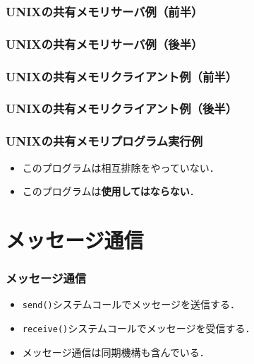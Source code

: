 \documentclass{beamer}                   %
\begin{document}
\begin{frame}
  \frametitle{UNIXの共有メモリサーバ例（前半）}
\end{frame}

\begin{frame}
  \frametitle{UNIXの共有メモリサーバ例（後半）}
\end{frame}

\begin{frame}
  \frametitle{UNIXの共有メモリクライアント例（前半）}
\end{frame}

\begin{frame}
  \frametitle{UNIXの共有メモリクライアント例（後半）}
\end{frame}

\begin{frame}
  \frametitle{UNIXの共有メモリプログラム実行例}
  \begin{itemize}
  \item このプログラムは相互排除をやっていない．
  \item このプログラムは{\bf 使用してはならない}．
  \end{itemize}
\end{frame}

\section{メッセージ通信}
\begin{frame}
  \frametitle{メッセージ通信}
  \begin{itemize}
  \item {\tt send()}システムコールでメッセージを送信する．
  \item {\tt receive()}システムコールでメッセージを受信する．
  \item メッセージ通信は同期機構も含んでいる．
  \end{itemize}
\end{frame}
\end{document}
